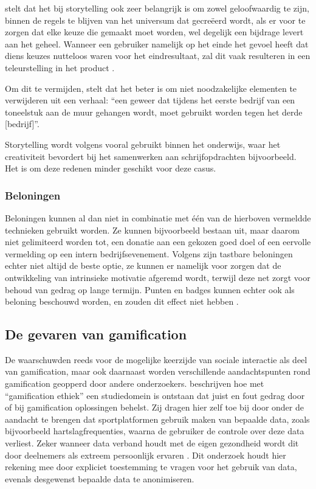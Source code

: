 \textcite{Marczewski2015} stelt dat het bij storytelling ook zeer belangrijk is om zowel geloofwaardig te zijn, binnen de regels te blijven van het universum dat gecreëerd wordt, als er voor te zorgen dat elke keuze die gemaakt moet worden, wel degelijk een bijdrage levert aan het geheel. Wanneer een gebruiker namelijk op het einde het gevoel heeft dat diens keuzes nutteloos waren voor het eindresultaat, zal dit vaak resulteren in een teleurstelling in het product \autocite{Marczewski2015}.

Om dit te vermijden, stelt \textcite{Duster1990} dat het beter is om niet noodzakelijke elementen te verwijderen uit een verhaal: ``een geweer dat tijdens het eerste bedrijf van een toneelstuk aan de muur gehangen wordt, moet gebruikt worden tegen het derde [bedrijf]''.

Storytelling wordt volgens \textcite{Schmoelz2018} vooral gebruikt binnen het onderwijs, waar het creativiteit bevordert bij het samenwerken aan schrijfopdrachten bijvoorbeeld. Het is om deze redenen minder geschikt voor deze casus.

\subsubsection{Beloningen}
Beloningen kunnen al dan niet in combinatie met één van de hierboven vermeldde technieken gebruikt worden. Ze kunnen bijvoorbeeld bestaan uit, maar daarom niet gelimiteerd worden tot, een donatie aan een gekozen goed doel of een eervolle vermelding op een intern bedrijfsevenement.
Volgens \textcite{Lewis2016} zijn tastbare beloningen echter niet altijd de beste optie, ze kunnen er namelijk voor zorgen dat de ontwikkeling van intrinsieke motivatie afgeremd wordt, terwijl deze net zorgt voor behoud van gedrag op lange termijn. Punten en badges kunnen echter ook als beloning beschouwd worden, en zouden dit effect niet hebben \autocite{Lewis2016}.

\subsection{De gevaren van gamification}
\label{ssec:gevaren}

De \textcite{Jong2010} waarschuwden reeds voor de mogelijke keerzijde van sociale interactie als deel van gamification, maar ook daarnaast worden verschillende aandachtspunten rond gamification geopperd door andere onderzoekers. \textcite{Hyrynsalmi2017} beschrijven hoe met “gamification ethiek” een studiedomein is ontstaan dat juist en fout gedrag door of bij gamification oplossingen behelst. Zij dragen hier zelf toe bij door onder de aandacht te brengen dat sportplatformen gebruik maken van bepaalde data, zoals bijvoorbeeld hartslagfrequenties, waarna de gebruiker de controle over deze data verliest. Zeker wanneer data verband houdt met de eigen gezondheid wordt dit door deelnemers als extreem persoonlijk ervaren \autocite{Hyrynsalmi2017}. Dit onderzoek houdt hier rekening mee door expliciet toestemming te vragen voor het gebruik van data, evenals desgewenst bepaalde data te anonimiseren.

